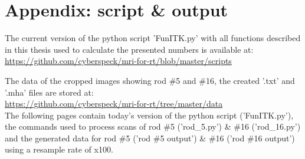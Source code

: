 \chapter*{Appendix: script \& output}

The current version of the python script 'FunITK.py' with all functions described in this thesis used to calculate the presented numbers is available at:\\
\url{https://github.com/cyberspeck/mri-for-rt/blob/master/scripts}

The data of the cropped images showing rod \#5 and \#16, the created '.txt' and '.mha' files are stored at: \\ \url{https://github.com/cyberspeck/mri-for-rt/tree/master/data} \\

The following pages contain today's version of the python script ('FunITK.py'), the commands used to process scans of rod \#5 ('rod\_5.py') \& \#16 ('rod\_16.py') and the generated data for rod \#5 ('rod \#5 output') \& \#16 ('rod \#16 output') using a resample rate of x100.